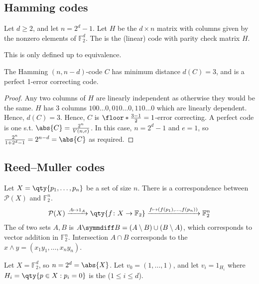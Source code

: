 \subsection{Hamming codes}

\begin{definition}
    Let $d \geq 2$, and let $n = 2^d - 1$.
    Let $H$ be the $d \times n$ matrix with columns given by the nonzero elements of $\mathbb F_2^d$.
    The  is the (linear) code with parity check matrix $H$.
\end{definition}

\begin{remark}
    This is only defined up to equivalence.
\end{remark}

\begin{lemma}
    The Hamming $(n, n-d)$-code $C$ has minimum distance $d(C) = 3$, and is a perfect 1-error correcting code.
\end{lemma}

\begin{proof}
    Any two columns of $H$ are linearly independent as otherwise they would be the same.
    $H$ has $3$ columns $100\dots0, 010\dots0, 110\dots0$ which are linearly dependent.
    Hence, $d(C) = 3$.
    Hence, $C$ is $\floor*{\frac{3-1}{2}} = 1$-error correcting.
    A perfect code is one s.t. $\abs{C} = \frac{2^n}{V(n,e)}$.
    In this case, $n = 2^d - 1$ and $e = 1$, so $\frac{2^n}{1 + 2^d - 1} = 2^{n-d} = \abs{C}$ as required.
\end{proof}

\subsection{Reed--Muller codes}
Let $X = \qty{p_1, \dots, p_n}$ be a set of size $n$.
There is a correspondence between $\mathcal P(X)$ and $\mathbb F_2^n$.
\begin{align*}
    \mathcal P(X) \xrightarrow{A \mapsto 1_A} \qty{f \colon X \to \mathbb F_2} \xrightarrow{f \mapsto (f(p_1), \dots, f(p_n))} \mathbb F_2^n
\end{align*}
The  of two sets $A, B$ is $A \symmdiff B = (A\setminus B) \cup (B \setminus A)$, which corresponds to vector addition in $\mathbb F_2^n$.
Intersection $A \cap B$ corresponds to the  $x \wedge y = (x_1 y_1, \dots, x_n y_n)$.

Let $X = \mathbb F_2^d$, so $n = 2^d = \abs{X}$.
Let $v_0 = (1, \dots, 1)$, and let $v_i = 1_{H_i}$ where $H_i = \qty{p \in X : p_i = 0}$ is the  ($1 \leq i \leq d$).

